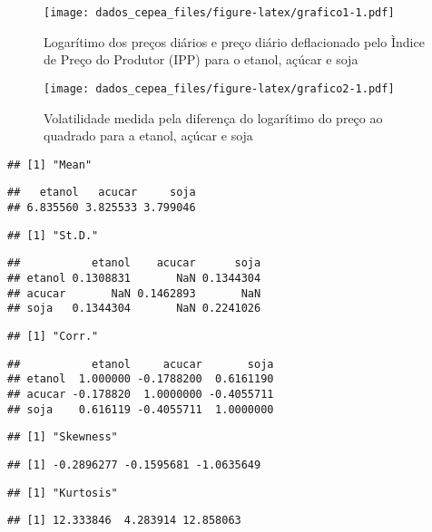 \documentclass[]{article}
\begin{document}
\begin{figure}[htbp]
\centering
\texttt{[image: dados\_cepea\_files/figure-latex/grafico1-1.pdf]}
\caption{Logarítimo dos preços diários e preço diário deflacionado pelo
Ìndice de Preço do Produtor (IPP) para o etanol, açúcar e soja}
\end{figure}

\begin{figure}[htbp]
\centering
\texttt{[image: dados\_cepea\_files/figure-latex/grafico2-1.pdf]}
\caption{Volatilidade medida pela diferença do logarítimo do preço ao
quadrado para a etanol, açúcar e soja}
\end{figure}

\begin{verbatim}
## [1] "Mean"
\end{verbatim}

\begin{verbatim}
##   etanol   acucar     soja 
## 6.835560 3.825533 3.799046
\end{verbatim}

\begin{verbatim}
## [1] "St.D."
\end{verbatim}

\begin{verbatim}
##           etanol    acucar      soja
## etanol 0.1308831       NaN 0.1344304
## acucar       NaN 0.1462893       NaN
## soja   0.1344304       NaN 0.2241026
\end{verbatim}

\begin{verbatim}
## [1] "Corr."
\end{verbatim}

\begin{verbatim}
##           etanol     acucar       soja
## etanol  1.000000 -0.1788200  0.6161190
## acucar -0.178820  1.0000000 -0.4055711
## soja    0.616119 -0.4055711  1.0000000
\end{verbatim}

\begin{verbatim}
## [1] "Skewness"
\end{verbatim}

\begin{verbatim}
## [1] -0.2896277 -0.1595681 -1.0635649
\end{verbatim}

\begin{verbatim}
## [1] "Kurtosis"
\end{verbatim}

\begin{verbatim}
## [1] 12.333846  4.283914 12.858063
\end{verbatim}
\end{document}
